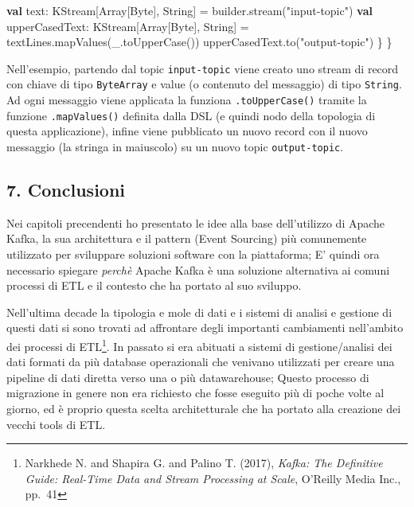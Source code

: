 \documentclass[]{article}
\newenvironment{Shaded}{}{}
\newcommand{\KeywordTok}[1]{\textcolor[rgb]{0.00,0.44,0.13}{\textbf{#1}}}
\newcommand{\StringTok}[1]{\textcolor[rgb]{0.25,0.44,0.63}{#1}}
\newcommand{\FunctionTok}[1]{\textcolor[rgb]{0.02,0.16,0.49}{#1}}
\newcommand{\NormalTok}[1]{#1}
\begin{document}
\begin{Shaded}
\begin{Highlighting}[]
    \KeywordTok{val}\NormalTok{ text: KStream[Array[Byte], String] = builder.}\FunctionTok{stream}\NormalTok{(}\StringTok{"input-topic"}\NormalTok{)}
    \KeywordTok{val}\NormalTok{ upperCasedText: KStream[Array[Byte], String] =}
\NormalTok{        textLines.}\FunctionTok{mapValues}\NormalTok{(_.}\FunctionTok{toUpperCase}\NormalTok{())}
\NormalTok{    upperCasedText.}\FunctionTok{to}\NormalTok{(}\StringTok{"output-topic"}\NormalTok{)}
\NormalTok{  \}}
\NormalTok{\}}
\end{Highlighting}
\end{Shaded}

\normalsize

Nell'esempio, partendo dal topic \texttt{input-topic} viene creato uno
stream di record con chiave di tipo \texttt{ByteArray} e value (o
contenuto del messaggio) di tipo \texttt{String}. Ad ogni messaggio
viene applicata la funziona \texttt{.toUpperCase()} tramite la funzione
\texttt{.mapValues()} definita dalla DSL (e quindi nodo della topologia
di questa applicazione), infine viene pubblicato un nuovo record con il
nuovo messaggio (la stringa in maiuscolo) su un nuovo topic
\texttt{output-topic}.

\newpage

\hypertarget{conclusioni}{\subsection{7.
Conclusioni}\label{conclusioni}}

Nei capitoli precendenti ho presentato le idee alla base dell'utilizzo
di Apache Kafka, la sua architettura e il pattern (Event Sourcing) più
comunemente utilizzato per sviluppare soluzioni software con la
piattaforma; E' quindi ora necessario spiegare \emph{perchè} Apache
Kafka è una soluzione alternativa ai comuni processi di ETL e il
contesto che ha portato al suo sviluppo.

Nell'ultima decade la tipologia e mole di dati e i sistemi di analisi e
gestione di questi dati si sono trovati ad affrontare degli importanti
cambiamenti nell'ambito dei processi di ETL\footnote{Narkhede N. and
  Shapira G. and Palino T. (2017), \emph{Kafka: The Definitive Guide:
  Real-Time Data and Stream Processing at Scale}, O'Reilly Media Inc.,
  pp.~41}. In passato si era abituati a sistemi di gestione/analisi dei
dati formati da più database operazionali che venivano utilizzati per
creare una pipeline di dati diretta verso una o più datawarehouse;
Questo processo di migrazione in genere non era richiesto che fosse
eseguito più di poche volte al giorno, ed è proprio questa scelta
architetturale che ha portato alla creazione dei vecchi tools di ETL.
\end{document}
